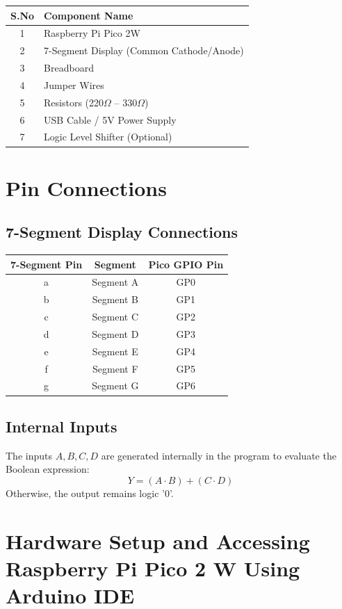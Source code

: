 \documentclass[12pt,a4paper]{article}
\begin{document}
\begin{tabular}{|c|l|}
\hline
\textbf{S.No} & \textbf{Component Name} \\
\hline
1 & Raspberry Pi Pico 2W \\
2 & 7-Segment Display (Common Cathode/Anode) \\
3 & Breadboard \\
4 & Jumper Wires \\
5 & Resistors (220$\Omega$ – 330$\Omega$) \\
6 & USB Cable / 5V Power Supply \\
7 & Logic Level Shifter (Optional) \\
\hline
\end{tabular}

\section{Pin Connections}

\subsection*{7-Segment Display Connections}

\begin{tabular}{|c|c|c|}
\hline
\textbf{7-Segment Pin} & \textbf{Segment} & \textbf{Pico GPIO Pin} \\
\hline
a & Segment A & GP0 \\
b & Segment B & GP1 \\
c & Segment C & GP2 \\
d & Segment D & GP3 \\
e & Segment E & GP4 \\
f & Segment F & GP5 \\
g & Segment G & GP6 \\
\hline
\end{tabular}

\subsection*{Internal Inputs}

The inputs $A, B, C, D$ are generated internally in the program to evaluate the Boolean expression:
\[
Y = (A \cdot B) + (C \cdot D)
\]
Otherwise, the output remains logic '0'.
\section{Hardware Setup and Accessing Raspberry Pi Pico 2 W Using Arduino IDE}
\end{document}
